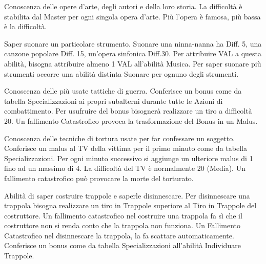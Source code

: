  Conoscenza delle opere d'arte, degli
autori e della loro storia. La difficolt\`a \`e stabilita dal
Master per ogni singola opera d'arte. Pi\`u l'opera \`e famosa,
pi\`u bassa \`e la difficolt\`a.

 Saper suonare un particolare strumento. Suonare
una ninna-nanna ha Diff. 5, una canzone popolare Diff. 15, un'opera
sinfonica Diff.30.  Per attribuire VAL a questa abilit\`a, bisogna
attribuire almeno 1 VAL all'abilit\`a Musica. Per saper suonare
pi\`u strumenti occorre una abilit\`a distinta Suonare per ognuno
degli strumenti.

 Conoscenza delle pi\`u usate tattiche
di guerra. Conferisce un bonus come da tabella Specializzazioni ai
propri subalterni durante tutte le Azioni di combattimento.  Per
usufruire del bonus bisogner\`a realizzare un tiro a difficolt\`a 20.
Un fallimento Catastrofico provoca la trasformazione del Bonus in un
Malus.


 Conoscenza delle tecniche di tortura usate per
far confessare un soggetto.  Conferisce un malus al TV della vittima
per il primo minuto come da tabella Specializzazioni. Per ogni minuto
successivo si aggiunge un ulteriore malus di 1 fino ad un massimo di
4. La difficolt\`a del TV \`e normalmente 20 (Media). 
Un fallimento catastrofico pu\`o provocare la morte del torturato.


 Abilit\`a di saper costruire trappole e saperle
disinnescare. Per disinnescare una trappola bisogna realizzare un tiro
in Trappole superiore al Tiro in Trappole del costruttore. Un
fallimento catastrofico nel costruire una trappola fa s\`i che il
costruttore non si renda conto che la trappola non funziona. Un
Fallimento Catastrofico nel disinnescare la trappola, la fa scattare
automaticamente.  Conferisce un bonus come da tabella Specializzazioni
all'abilit\`a Individuare Trappole.

